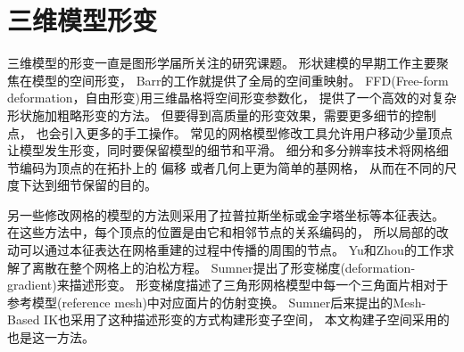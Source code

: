 \section{三维模型形变}
三维模型的形变一直是图形学届所关注的研究课题。
形状建模的早期工作主要聚焦在模型的空间形变，
Barr的工作\cite{barr1984global}就提供了全局的空间重映射。
FFD(Free-form deformation，自由形变)\cite{sederberg1986free}用三维晶格将空间形变参数化，
提供了一个高效的对复杂形状施加粗略形变的方法。
但要得到高质量的形变效果，需要更多细节的控制点\cite{coquillart1990extended}，
也会引入更多的手工操作。
常见的网格模型修改工具允许用户移动少量顶点让模型发生形变，同时要保留模型的细节和平滑。
细分和多分辨率技术将网格细节编码为顶点的在拓扑上的
偏移\cite{zorin1997interactive}\cite{kobbelt2000multiresolution}
或者几何上更为简单的基网格\cite{kobbelt1998interactive}，
从而在不同的尺度下达到细节保留的目的。

另一些修改网格的模型的方法则采用了拉普拉斯坐标或金字塔坐标等本征表达。
在这些方法中，每个顶点的位置是由它和相邻节点的关系编码的，
所以局部的改动可以通过本征表达在网格重建的过程中传播的周围的节点。
Yu和Zhou的工作\cite{yu2004mesh}求解了离散在整个网格上的泊松方程。
Sumner提出了形变梯度(deformation-gradient)\cite{sumner2004deformation}来描述形变。
形变梯度描述了三角形网格模型中每一个三角面片相对于参考模型(reference mesh)中对应面片的仿射变换。
Sumner后来提出的Mesh-Based IK\cite{sumner2005mesh}也采用了这种描述形变的方式构建形变子空间，
本文构建子空间采用的也是这一方法。
